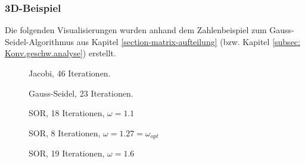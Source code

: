 \begin{refsection}
\subsubsection{3D-Beispiel}
Die folgenden Visualisierungen wurden anhand dem Zahlenbeispiel zum
Gauss-Seidel-Algorithmus aus Kapitel \ref{section-matrix-aufteilung}
(bzw. Kapitel \ref{subsec: Konv.geschw.analyse}) erstellt.
\begin{figure}[!ht]\centering
	\caption{Jacobi, 46 Iterationen.}
	\label{fig:Jac. 3D Bsp}
\end{figure}
\begin{figure}[!ht]\centering
	\caption{Gauss-Seidel, 23 Iterationen.}
	\label{fig:G.-S. 3D Bsp}
\end{figure}
\begin{figure}[!ht]\centering
	\caption{SOR, 18 Iterationen, $\omega=1.1$}
	\label{fig:SOR w=1.1 3D Bsp}
\end{figure}
\begin{figure}[!ht]\centering
	\caption{SOR, 8 Iterationen, $\omega=1.27=\omega_{opt}$}
	\label{fig:SOR w=1.27 3D Bsp}
\end{figure}
\begin{figure}[!ht]\centering
	\caption{SOR, 19 Iterationen, $\omega=1.6$}
	\label{fig:SOR w=1.6 3D Bsp}
\end{figure}
			

\end{refsection}
